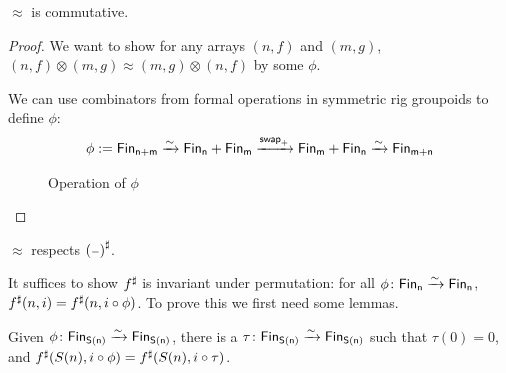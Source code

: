 \begin{proposition}
    $\approx$ is commutative.
\end{proposition}

\begin{proof}
We want to show for any arrays $(n, f)$ and $(m, g)$, $(n, f) \otimes (m, g) \approx (m, g) \otimes (n, f)$
by some $\phi$.

We can use combinators from formal operations in symmetric rig groupoids \cite{choudhurySymmetriesReversibleProgramming2022} to define $\phi$:
\begin{align*}
    \phi := \Fin[n+m] \xto{\sim} \Fin[n] + \Fin[m] \xto{\term{swap}_{+}} \Fin[m] + \Fin[n] \xto{\sim} \Fin[m+n] \\
\end{align*}

\begin{figure}[H]
    \centering
    \vspace{-2em}
    \caption{Operation of $\phi$}
    \label{fig:enter-label}
\end{figure}

\end{proof}

\begin{proposition}
    $\approx$ respects ${({\scriptstyle{-}})}^{\sharp}$.
\end{proposition}

It suffices to show ${f}^{\sharp}$ is invariant under permutation: for all $\phi\colon \Fin[n]\xto{\sim}\Fin[n]$,
$\ext{f}(n, i) \id \ext{f}(n, i \circ \phi)$. To prove this we first need some lemmas.

\begin{lemma}\label{bag:tau}
Given $\phi\colon \Fin[S(n)]\xto{\sim}\Fin[S(n)]$, there is a $\tau\colon \Fin[S(n)]\xto{\sim}\Fin[S(n)]$
such that $\tau(0) = 0$, and ${f}^{\sharp}(S(n), i \circ \phi) = {f}^{\sharp}(S(n), i \circ \tau)$.
\end{lemma}


